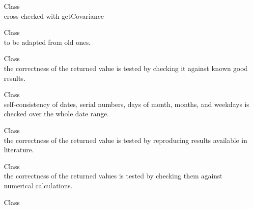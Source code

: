 \begin{DoxyRefList}
\item[Class \doxylink{class_quant_lib_1_1_covariance_decomposition}{Quant\+Lib\+::Covariance\+Decomposition} ]\hfill \\
\label{test__test000050}%
%
cross checked with get\+Covariance  
\item[Class \doxylink{class_quant_lib_1_1_cubic_interpolation}{Quant\+Lib\+::Cubic\+Interpolation} ]\hfill \\
\label{test__test000047}%
%
to be adapted from old ones. 
\item[Class \doxylink{class_quant_lib_1_1_cumulative_poisson_distribution}{Quant\+Lib\+::Cumulative\+Poisson\+Distribution} ]\hfill \\
\label{test__test000037}%
%
the correctness of the returned value is tested by checking it against known good results.  
\item[Class \doxylink{class_quant_lib_1_1_date}{Quant\+Lib\+::Date} ]\hfill \\
\label{test__test000178}%
%
self-\/consistency of dates, serial numbers, days of month, months, and weekdays is checked over the whole date range.  
\item[Class \doxylink{class_quant_lib_1_1_deng_li_zhou_basket_engine}{Quant\+Lib\+::Deng\+Li\+Zhou\+Basket\+Engine} ]\hfill \\
\label{test__test000111}%
%
the correctness of the returned value is tested by reproducing results available in literature.  
\item[Class \doxylink{class_quant_lib_1_1_derived_quote}{Quant\+Lib\+::Derived\+Quote\texorpdfstring{$<$}{<} Unary\+Function \texorpdfstring{$>$}{>}} ]\hfill \\
\label{test__test000163}%
%
the correctness of the returned values is tested by checking them against numerical calculations.  
\item[Class \doxylink{class_quant_lib_1_1_digital_coupon}{Quant\+Lib\+::Digital\+Coupon} ]\hfill \\
\label{test__test000001}%
%


\end{DoxyRefList}
